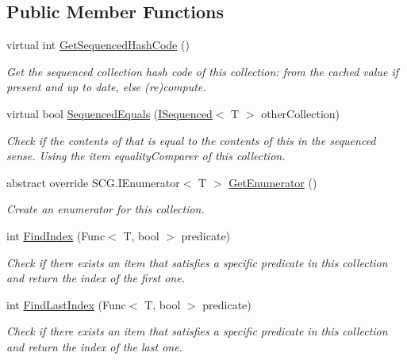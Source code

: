 \subsection*{Public Member Functions}
\begin{DoxyCompactItemize}
\item 
virtual int \hyperlink{class_c5_1_1_sequenced_base_aa2bd62bc02019cea40f20dd8bced6851}{Get\+Sequenced\+Hash\+Code} ()
\begin{DoxyCompactList}\small\item\em Get the sequenced collection hash code of this collection\+: from the cached value if present and up to date, else (re)compute. \end{DoxyCompactList}\item 
virtual bool \hyperlink{class_c5_1_1_sequenced_base_a92477426990ce67e250643637dfee6ed}{Sequenced\+Equals} (\hyperlink{interface_c5_1_1_i_sequenced}{I\+Sequenced}$<$ T $>$ other\+Collection)
\begin{DoxyCompactList}\small\item\em Check if the contents of that is equal to the contents of this in the sequenced sense. Using the item equality\+Comparer of this collection. \end{DoxyCompactList}\item 
abstract override S\+C\+G.\+I\+Enumerator$<$ T $>$ \hyperlink{class_c5_1_1_sequenced_base_a07d117175b630fd7f87f6e61b05259dc}{Get\+Enumerator} ()
\begin{DoxyCompactList}\small\item\em Create an enumerator for this collection. \end{DoxyCompactList}\item 
int \hyperlink{class_c5_1_1_sequenced_base_a343eb003b037cec241b213e91ede5333}{Find\+Index} (Func$<$ T, bool $>$ predicate)
\begin{DoxyCompactList}\small\item\em Check if there exists an item that satisfies a specific predicate in this collection and return the index of the first one. \end{DoxyCompactList}\item 
int \hyperlink{class_c5_1_1_sequenced_base_a22d7bc5d1aa2ce16d029639fb8db62bd}{Find\+Last\+Index} (Func$<$ T, bool $>$ predicate)
\begin{DoxyCompactList}\small\item\em Check if there exists an item that satisfies a specific predicate in this collection and return the index of the last one. \end{DoxyCompactList}\end{DoxyCompactItemize}
